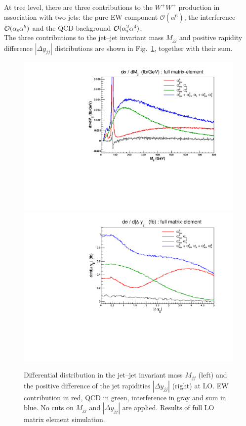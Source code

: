 At tree level, there are three contributions to the $W^+W^+$ production in association with two jets: the pure EW component $\mathcal{O}(\alpha^6)$, the interference $\mathcal{O}(\alpha_\text{s}\alpha^5)$ and the QCD background $\mathcal{O}(\alpha_\text{s}^2\alpha^4)$.\\
The three contributions to the jet--jet invariant mass $M_{jj}$ and positive rapidity difference $|\Delta y_{jj}|$ distributions are shown in Fig.~\ref{fig:mjjdyjj_1d}, together with their sum.
\begin{figure}[hbt]
\centering
\includegraphics[scale=0.395]{figures/scanfigures/mjj_full.pdf}
\includegraphics[scale=0.395]{figures/scanfigures/dyjj_full.pdf}
\caption{Differential distribution in the jet--jet invariant mass $M_{jj}$ (left) and the positive difference of the jet rapidities $|\Delta y_{jj}|$ (right) at LO. EW contribution in red, QCD in green, interference in gray and sum in blue. No cuts on $M_{jj}$ and $|\Delta y_{jj}|$ are applied. Results of full LO matrix element simulation.}
\label{fig:mjjdyjj_1d}
\end{figure}
